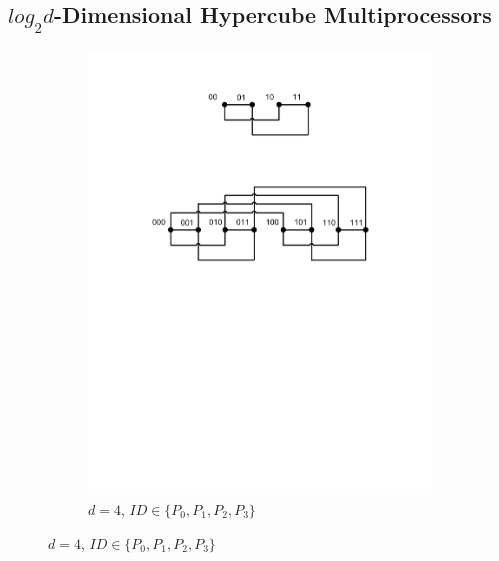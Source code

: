 \documentclass{iacrtrans}
\theoremstyle{plain}
\begin{document}
\subsection{$log_2d$-Dimensional Hypercube Multiprocessors}
\begin{figure}[!tb]
\centering
\begin{subfigure}[t]{0.5\textwidth}\centering
\includegraphics[width=\textwidth]{./fig/HyperCube1.pdf}
\caption{$d=4$, $ID\in\{P_0,P_1,P_2,P_3\}$}
\label{fig:hypercube4}
\end{subfigure}


\end{figure}
\end{document}
